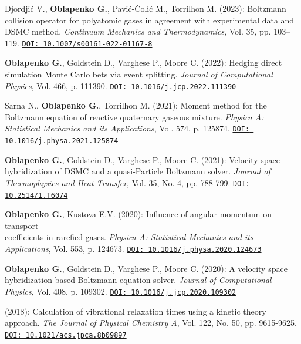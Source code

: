 \begin{enumerate}
\journalitemprsc Djordji\'c V., \textbf{Oblapenko G.}, Pavi\'c-\v Coli\'{c} M., Torrilhon M. (2023): Boltzmann collision operator for polyatomic gases in agreement with experimental data and DSMC method. \textit{Continuum Mechanics and Thermodynamics}, Vol. 35, pp. 103--119.\newline
    \href{https://doi.org/10.1007/s00161-022-01167-8}{\texttt{DOI: 10.1007/s00161-022-01167-8}}

\journalitemprsc \textbf{{Oblapenko G.}}, Goldstein D., Varghese P., Moore C. (2022): Hedging direct simulation Monte Carlo bets via event splitting. \textit{Journal of Computational Physics}, Vol. 466, p. 111390.\newline
    \href{https://doi.org/10.1016/j.jcp.2022.111390}{\texttt{DOI: 10.1016/j.jcp.2022.111390}}

\journalitemprsc Sarna N., \textbf{Oblapenko G.}, Torrilhon M. (2021): Moment method for the Boltzmann equation of reactive quaternary gaseous mixture. \textit{Physica A: Statistical Mechanics and its Applications}, Vol. 574, p. 125874.\newline
    \href{https://doi.org/10.1016/j.physa.2021.125874}{\texttt{DOI: 10.1016/j.physa.2021.125874}}

\journalitemprsc \textbf{{Oblapenko G.}}, Goldstein D., Varghese P., Moore C. (2021): Velocity-space hybridization of DSMC and a quasi-Particle Boltzmann solver. \textit{Journal of Thermophysics and Heat Transfer}, Vol. 35, No. 4, pp. 788-799.\newline
    \href{https://doi.org/10.2514/1.T6074}{\texttt{DOI: 10.2514/1.T6074}}

\journalitemprsc \textbf{{Oblapenko G.}}, Kustova E.V. (2020): Influence of angular momentum on transport\\ coefficients in rarefied gases. \textit{Physica A: Statistical Mechanics and its Applications}, Vol. 553, p. 124673.\newline
    \href{https://doi.org/10.1016/j.physa.2020.124673}{\texttt{DOI: 10.1016/j.physa.2020.124673}}

\journalitemprsc \textbf{{Oblapenko G.}}, Goldstein D., Varghese P., Moore C. (2020): A velocity space hybridization-based Boltzmann equation solver. \textit{Journal of Computational Physics}, Vol. 408, p. 109302.\newline
    \href{https://doi.org/10.1016/j.jcp.2020.109302}{\texttt{DOI: 10.1016/j.jcp.2020.109302}}

 (2018): Calculation of vibrational relaxation times using a kinetic theory approach. \textit{The Journal of Physical Chemistry A}, Vol. 122, No. 50, pp. 9615-9625.\newline
    \href{https://doi.org/10.1021/acs.jpca.8b09897}{\texttt{DOI: 10.1021/acs.jpca.8b09897}}


\end{enumerate}
